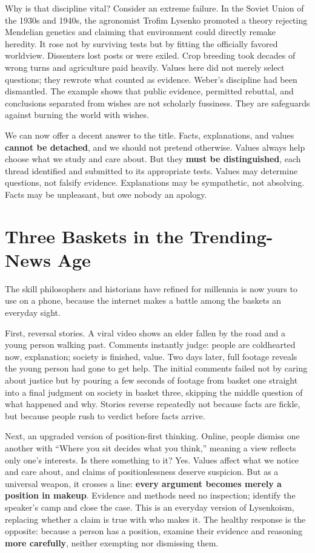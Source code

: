 Why is that discipline vital? Consider an extreme failure. In the Soviet Union of the 1930s and 1940s, the agronomist Trofim Lysenko promoted a theory rejecting Mendelian genetics and claiming that environment could directly remake heredity. It rose not by surviving tests but by fitting the officially favored worldview. Dissenters lost posts or were exiled. Crop breeding took decades of wrong turns and agriculture paid heavily. Values here did not merely select questions; they rewrote what counted as evidence. Weber's discipline had been dismantled. The example shows that public evidence, permitted rebuttal, and conclusions separated from wishes are not scholarly fussiness. They are safeguards against burning the world with wishes.

We can now offer a decent answer to the title. Facts, explanations, and values \textbf{cannot be detached}, and we should not pretend otherwise. Values always help choose what we study and care about. But they \textbf{must be distinguished}, each thread identified and submitted to its appropriate tests. Values may determine questions, not falsify evidence. Explanations may be sympathetic, not absolving. Facts may be unpleasant, but owe nobody an apology.

\section{Three Baskets in the Trending-News Age}
The skill philosophers and historians have refined for millennia is now yours to use on a phone, because the internet makes a battle among the baskets an everyday sight.

First, reversal stories. A viral video shows an elder fallen by the road and a young person walking past. Comments instantly judge: people are coldhearted now, explanation; society is finished, value. Two days later, full footage reveals the young person had gone to get help. The initial comments failed not by caring about justice but by pouring a few seconds of footage from basket one straight into a final judgment on society in basket three, skipping the middle question of what happened and why. Stories reverse repeatedly not because facts are fickle, but because people rush to verdict before facts arrive.

Next, an upgraded version of position-first thinking. Online, people dismiss one another with ``Where you sit decides what you think,'' meaning a view reflects only one's interests. Is there something to it? Yes. Values affect what we notice and care about, and claims of positionlessness deserve suspicion. But as a universal weapon, it crosses a line: \textbf{every argument becomes merely a position in makeup}. Evidence and methods need no inspection; identify the speaker's camp and close the case. This is an everyday version of Lysenkoism, replacing whether a claim is true with who makes it. The healthy response is the opposite: because a person has a position, examine their evidence and reasoning \textbf{more carefully}, neither exempting nor dismissing them.

